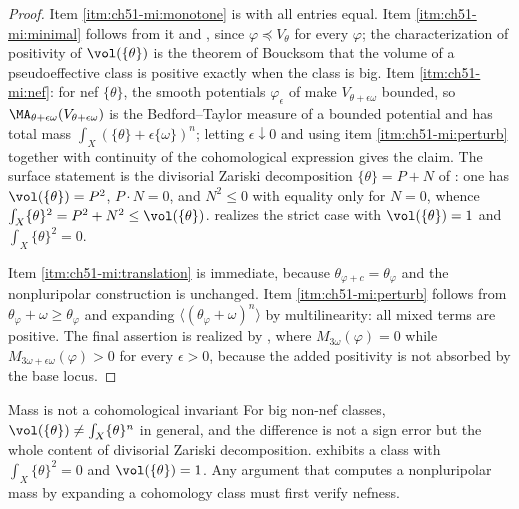 \begin{proof}
Item \cref{itm:ch51-mi:monotone} is
 with all entries equal.  Item
\cref{itm:ch51-mi:minimal} follows from it and
, since \(\varphi\preceq V_\theta\)
for every \(\varphi\); the characterization of positivity of
\(\vol(\{\theta\})\) is the theorem of Boucksom
\cite{Bou02,Bou02b} that the volume of a pseudoeffective class is
positive exactly when the class is big.  Item \cref{itm:ch51-mi:nef}: for
nef \(\{\theta\}\), the smooth potentials \(\varphi_\epsilon\) of
 make \(V_{\theta+\epsilon\omega}\) bounded, so
\(\MA_{\theta+\epsilon\omega}(V_{\theta+\epsilon\omega})\) is the
Bedford--Taylor measure of a bounded potential and has total mass
\(\int_X(\{\theta\}+\epsilon\{\omega\})^n\); letting \(\epsilon\downarrow0\)
and using item \cref{itm:ch51-mi:perturb} together with continuity of the
cohomological expression gives the claim.  The surface statement is the
divisorial Zariski decomposition \(\{\theta\}=P+N\) of \cite{Bou04}: one
has \(\vol(\{\theta\})=P^2\), \(P\cdot N=0\), and \(N^2\leq0\) with
equality only for \(N=0\), whence
\(\int_X\{\theta\}^2=P^2+N^2\leq\vol(\{\theta\})\).
 realizes the strict case with
\(\vol(\{\theta\})=1\) and \(\int_X\{\theta\}^2=0\).

Item \cref{itm:ch51-mi:translation} is immediate, because
\(\theta_{\varphi+c}=\theta_\varphi\) and the nonpluripolar construction
is unchanged.  Item \cref{itm:ch51-mi:perturb} follows from
\(\theta_\varphi+\omega\geq\theta_\varphi\) and expanding
\(\langle(\theta_\varphi+\omega)^n\rangle\) by multilinearity: all mixed
terms are positive.  The final assertion is realized by
, where \(M_{3\omega}(\varphi)=0\) while
\(M_{3\omega+\epsilon\omega}(\varphi)>0\) for every \(\epsilon>0\),
because the added positivity is not absorbed by the base locus.
\end{proof}

\begin{warning}{Mass is not a cohomological invariant}
\label{warn:ch51-mass-not-cohomological}
For big non-nef classes, \(\vol(\{\theta\})\neq\int_X\{\theta\}^n\) in
general, and the difference is not a sign error but the whole content of
divisorial Zariski decomposition.   exhibits a
class with \(\int_X\{\theta\}^2=0\) and \(\vol(\{\theta\})=1\).  Any
argument that computes a nonpluripolar mass by expanding a cohomology
class must first verify nefness.
\end{warning}

